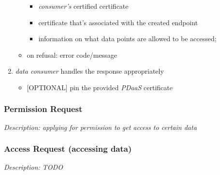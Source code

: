 \documentclass[12pt,english,a4paper,titlepage,cleardoublepage=empty,dottedtoc]{report}
\providecommand{\tightlist}{%
  \setlength{\itemsep}{0pt}\setlength{\parskip}{0pt}}
\begin{document}
\begin{enumerate}
\begin{itemize}
    \begin{itemize}
    \tightlist
    \item
      \emph{consumer's} certified certificate
    \item
      certificate that's associated with the created endpoint
    \item
      information on what data points are allowed to be accessed;
    \end{itemize}
  \item
    on refusal: error code/message
  \end{itemize}
\item
  \emph{data consumer} handles the response appropriately

  \begin{itemize}
  \tightlist
  \item
    {[}OPTIONAL{]} pin the provided \emph{PDaaS} certificate
  \end{itemize}
\end{enumerate}

\subsubsection{Permission Request}\label{permission-request}

\emph{Description: applying for permission to get access to certain
data}

\subsubsection{Access Request (accessing
data)}\label{access-request-accessing-data}

\emph{Description: TODO}
\end{document}
